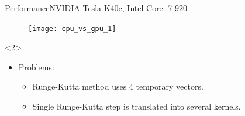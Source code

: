 \documentclass[@BEAMER_OPTIONS@]{beamer}
\begin{document}
\begin{frame}[fragile]{Performance}{NVIDIA Tesla K40c, Intel Core i7 920
    \vspace{0.25\baselineskip}}
    \begin{figure}
        \texttt{[image: cpu\_vs\_gpu\_1]}
    \end{figure}
    \vspace{-2\baselineskip}
    \begin{uncoverenv}<2>
        \begin{itemize}
            \item Problems:
                \begin{itemize}
                    \item Runge-Kutta method uses 4 temporary vectors.
                    \item Single Runge-Kutta step is translated into several
                        kernels.
                \end{itemize}
        \end{itemize}
    \end{uncoverenv}
\end{frame}
\end{document}
